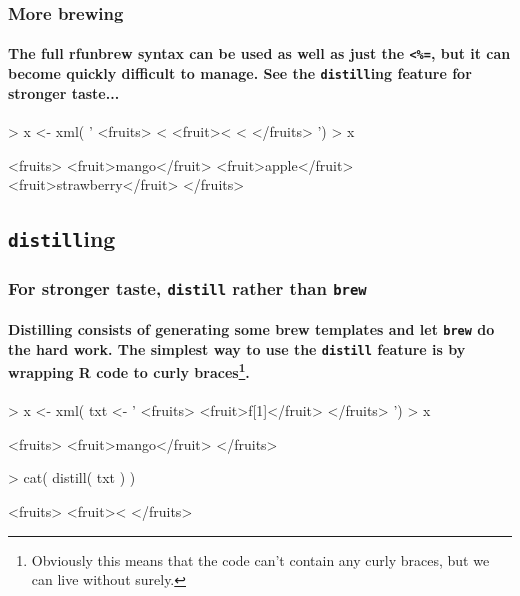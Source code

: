 \documentclass[smaller]{beamer}
\newcommand{\rfun}[1]{\texttt{#1}}
\begin{document}
\begin{frame}[fragile]
 \frametitle{More brewing}
\framesubtitle{The full rfun{brew} syntax can be used as well as just the \texttt{<\%=}, but it can become quickly difficult to manage. See the \rfun{distill}ing feature for stronger taste...}

\begin{Schunk}
\begin{Sinput}
> x <- xml( ' 
    <fruits>
      <%
        <fruit><%
      <%
    </fruits>
  ')
> x
\end{Sinput}
\begin{Soutput}
<fruits>
 <fruit>mango</fruit>
 <fruit>apple</fruit>
 <fruit>strawberry</fruit>
</fruits>
\end{Soutput}
\end{Schunk}
\end{frame}


\subsection{\texttt{distill}ing}
\begin{frame}[fragile]
\frametitle{For stronger taste, \rfun{distill} rather than \rfun{brew} }
\framesubtitle{Distilling consists of generating some brew templates and let \rfun{brew} do the hard work. The simplest way to use the \rfun{distill} feature
is by wrapping R code to curly braces\footnote{Obviously this means that the code can't contain any curly braces, but we can live without surely.}. }

\begin{Schunk}
\begin{Sinput}
> x <- xml( txt <- ' 
    <fruits>
      <fruit>{f[1]}</fruit>
    </fruits>
  ')
> x
\end{Sinput}
\begin{Soutput}
<fruits>
 <fruit>mango</fruit>
</fruits>
\end{Soutput}
\begin{Sinput}
> cat( distill( txt ) )
\end{Sinput}
\begin{Soutput}
  <fruits>
    <fruit><%
  </fruits>
\end{Soutput}
\end{Schunk}
\end{frame}
\end{document}
